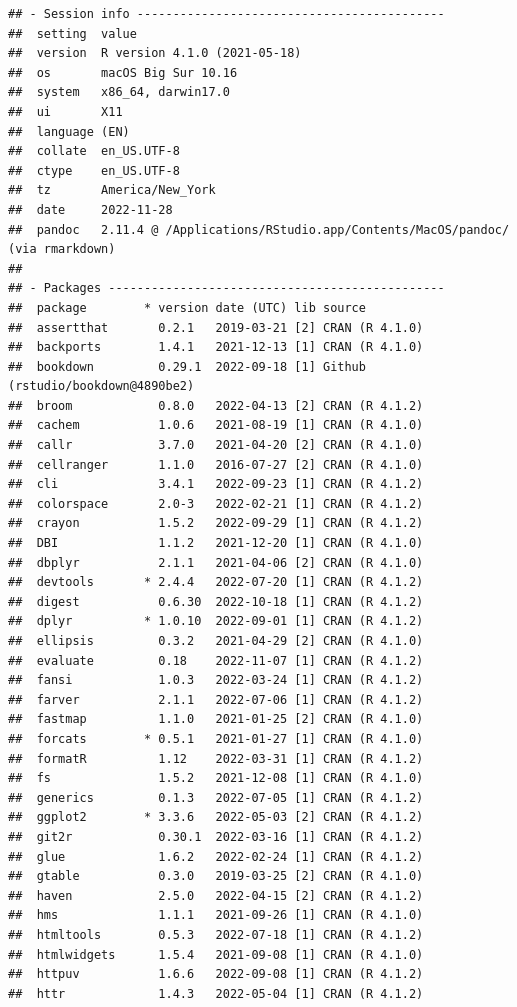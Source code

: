 \documentclass[print]{nuthesis}
\begin{document}
\begin{verbatim}
## - Session info -------------------------------------------
##  setting  value
##  version  R version 4.1.0 (2021-05-18)
##  os       macOS Big Sur 10.16
##  system   x86_64, darwin17.0
##  ui       X11
##  language (EN)
##  collate  en_US.UTF-8
##  ctype    en_US.UTF-8
##  tz       America/New_York
##  date     2022-11-28
##  pandoc   2.11.4 @ /Applications/RStudio.app/Contents/MacOS/pandoc/ (via rmarkdown)
## 
## - Packages -----------------------------------------------
##  package        * version date (UTC) lib source
##  assertthat       0.2.1   2019-03-21 [2] CRAN (R 4.1.0)
##  backports        1.4.1   2021-12-13 [1] CRAN (R 4.1.0)
##  bookdown         0.29.1  2022-09-18 [1] Github (rstudio/bookdown@4890be2)
##  broom            0.8.0   2022-04-13 [2] CRAN (R 4.1.2)
##  cachem           1.0.6   2021-08-19 [1] CRAN (R 4.1.0)
##  callr            3.7.0   2021-04-20 [2] CRAN (R 4.1.0)
##  cellranger       1.1.0   2016-07-27 [2] CRAN (R 4.1.0)
##  cli              3.4.1   2022-09-23 [1] CRAN (R 4.1.2)
##  colorspace       2.0-3   2022-02-21 [1] CRAN (R 4.1.2)
##  crayon           1.5.2   2022-09-29 [1] CRAN (R 4.1.2)
##  DBI              1.1.2   2021-12-20 [1] CRAN (R 4.1.0)
##  dbplyr           2.1.1   2021-04-06 [2] CRAN (R 4.1.0)
##  devtools       * 2.4.4   2022-07-20 [1] CRAN (R 4.1.2)
##  digest           0.6.30  2022-10-18 [1] CRAN (R 4.1.2)
##  dplyr          * 1.0.10  2022-09-01 [1] CRAN (R 4.1.2)
##  ellipsis         0.3.2   2021-04-29 [2] CRAN (R 4.1.0)
##  evaluate         0.18    2022-11-07 [1] CRAN (R 4.1.2)
##  fansi            1.0.3   2022-03-24 [1] CRAN (R 4.1.2)
##  farver           2.1.1   2022-07-06 [1] CRAN (R 4.1.2)
##  fastmap          1.1.0   2021-01-25 [2] CRAN (R 4.1.0)
##  forcats        * 0.5.1   2021-01-27 [1] CRAN (R 4.1.0)
##  formatR          1.12    2022-03-31 [1] CRAN (R 4.1.2)
##  fs               1.5.2   2021-12-08 [1] CRAN (R 4.1.0)
##  generics         0.1.3   2022-07-05 [1] CRAN (R 4.1.2)
##  ggplot2        * 3.3.6   2022-05-03 [2] CRAN (R 4.1.2)
##  git2r            0.30.1  2022-03-16 [1] CRAN (R 4.1.2)
##  glue             1.6.2   2022-02-24 [1] CRAN (R 4.1.2)
##  gtable           0.3.0   2019-03-25 [2] CRAN (R 4.1.0)
##  haven            2.5.0   2022-04-15 [2] CRAN (R 4.1.2)
##  hms              1.1.1   2021-09-26 [1] CRAN (R 4.1.0)
##  htmltools        0.5.3   2022-07-18 [1] CRAN (R 4.1.2)
##  htmlwidgets      1.5.4   2021-09-08 [1] CRAN (R 4.1.0)
##  httpuv           1.6.6   2022-09-08 [1] CRAN (R 4.1.2)
##  httr             1.4.3   2022-05-04 [1] CRAN (R 4.1.2)

\end{verbatim}
\end{document}
